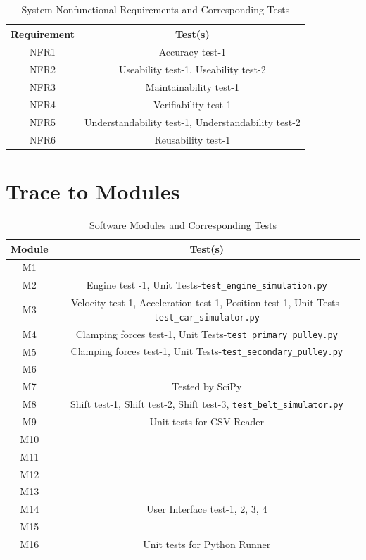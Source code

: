 \documentclass[12pt, titlepage]{article}
\begin{document}
  \begin{table}[h!]
    \centering
      \begin{tabular}{|c|c|}
        \hline
        \textbf{Requirement} & \textbf{Test(s)} \\ \hline
        NFR1 & Accuracy test-1  \\ \hline
        NFR2 & Useability test-1, Useability test-2 \\ \hline
        NFR3 & Maintainability test-1 \\ \hline
        NFR4 & Verifiability test-1 \\ \hline
        NFR5 & Understandability test-1, Understandability test-2 \\ \hline
        NFR6 & Reusability test-1 \\ \hline
        \end{tabular}
        \caption{System Nonfunctional Requirements and Corresponding Tests}
        \label{tab:requirements_tests}
    \end{table}
		
\section{Trace to Modules}	

\begin{table}[H]
  \centering
    \begin{tabular}{|c|c|}
      \hline
      \textbf{Module} & \textbf{Test(s)} \\ \hline
      M1 & \\ \hline
      M2 & Engine test -1, Unit Tests-\texttt{test\_engine\_simulation.py} \\ \hline
      M3 & Velocity test-1, Acceleration test-1, Position test-1, Unit Tests-\texttt{test\_car\_simulator.py} \\ \hline
      M4 & Clamping forces test-1, Unit Tests-\texttt{test\_primary\_pulley.py} \\ \hline
      M5 & Clamping forces test-1, Unit Tests-\texttt{test\_secondary\_pulley.py} \\ \hline
      M6 &  \\ \hline
      M7 & Tested by SciPy \\ \hline
      M8 & Shift test-1, Shift test-2, Shift test-3, \texttt{test\_belt\_simulator.py}  \\ \hline
      M9 & Unit tests for CSV Reader \\ \hline
      M10 &  \\ \hline
      M11 &  \\ \hline
      M12 &  \\ \hline
      M13 &  \\ \hline
      M14 & User Interface test-1, 2, 3, 4 \\ \hline
      M15 &  \\ \hline
      M16 &  Unit tests for Python Runner\\ \hline
      \end{tabular}
      \caption{Software Modules and Corresponding Tests}
      \label{tab:modules_tests}
  \end{table}
\end{document}
